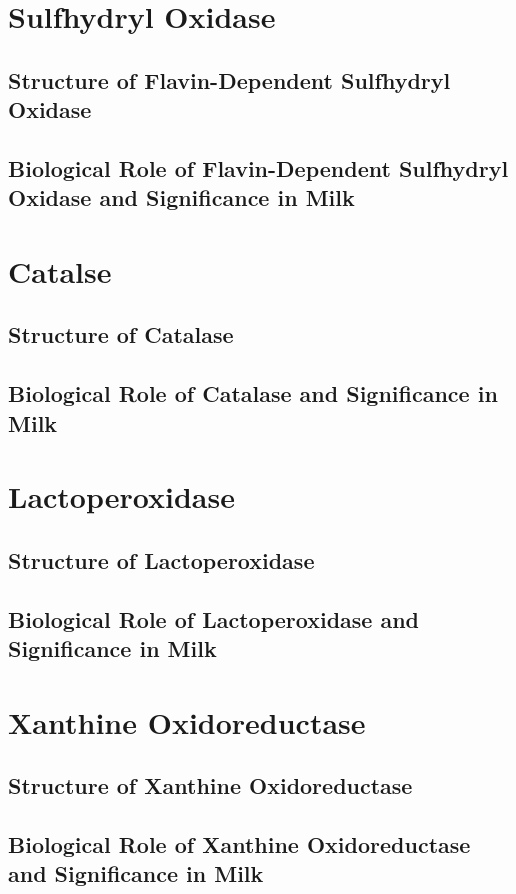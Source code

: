 \section{Sulfhydryl Oxidase}


\subsection*{Structure of Flavin-Dependent Sulfhydryl Oxidase}


\subsection*{Biological Role of Flavin-Dependent Sulfhydryl Oxidase and Significance in Milk}

\cite*{RM_01}

\section{Catalse}


\subsection*{Structure of Catalase}


\subsection*{Biological Role of Catalase and Significance in Milk}


\section{Lactoperoxidase}


\subsection*{Structure of Lactoperoxidase}


\subsection*{Biological Role of Lactoperoxidase and Significance in Milk}


\section{Xanthine Oxidoreductase}


\subsection*{Structure of Xanthine Oxidoreductase}



\subsection*{Biological Role of Xanthine Oxidoreductase and Significance in Milk}

 
